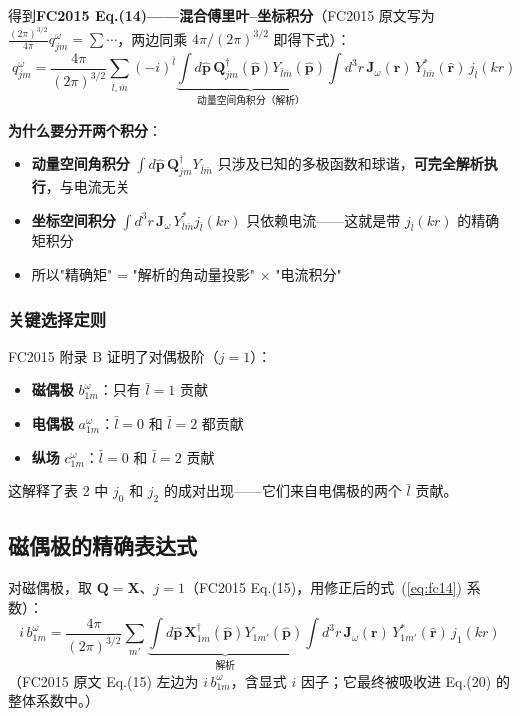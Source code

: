 得到\textbf{FC2015 Eq.(14)——混合傅里叶--坐标积分}（FC2015 原文写为
$\frac{(2\pi)^{3/2}}{4\pi}q^\omega_{jm}=\sum\cdots$，两边同乘 $4\pi/(2\pi)^{3/2}$ 即得下式）：
\begin{equation}
  \boxed{\;
  q^\omega_{jm} = \frac{4\pi}{(2\pi)^{3/2}}\sum_{\bar{l},\bar{m}}(-i)^{\bar{l}}
    \underbrace{\int d\hat{\mathbf{p}}\,\mathbf{Q}^\dagger_{jm}(\hat{\mathbf{p}})Y_{\bar{l}\bar{m}}(\hat{\mathbf{p}})}_{\text{动量空间角积分（解析）}}
    \int d^3r\,\mathbf{J}_\omega(\mathbf{r})\,Y^*_{\bar{l}\bar{m}}(\hat{\mathbf{r}})\,j_{\bar{l}}(kr)
  \;}
  \label{eq:fc14}
\end{equation}

\begin{nontrivial}
\textbf{为什么要分开两个积分}：
\begin{itemize}
  \item \textbf{动量空间角积分} $\int d\hat{\mathbf{p}}\,\mathbf{Q}^\dagger_{jm}Y_{\bar{l}\bar{m}}$
    只涉及已知的多极函数和球谐，\textbf{可完全解析执行}，与电流无关
  \item \textbf{坐标空间积分} $\int d^3r\,\mathbf{J}_\omega\,Y^*_{\bar{l}\bar{m}}j_{\bar{l}}(kr)$
    只依赖电流——这就是带 $j_{\bar{l}}(kr)$ 的精确矩积分
  \item 所以"精确矩" = "解析的角动量投影" $\times$ "电流积分"
\end{itemize}
\end{nontrivial}

\subsubsection{关键选择定则}

FC2015 附录 B 证明了对偶极阶（$j=1$）：
\begin{itemize}
  \item \textbf{磁偶极} $b^\omega_{1m}$：只有 $\bar{l}=1$ 贡献
  \item \textbf{电偶极} $a^\omega_{1m}$：$\bar{l}=0$ 和 $\bar{l}=2$ 都贡献
  \item \textbf{纵场} $c^\omega_{1m}$：$\bar{l}=0$ 和 $\bar{l}=2$ 贡献
\end{itemize}
这解释了表 2 中 $j_0$ 和 $j_2$ 的成对出现——它们来自电偶极的两个 $\bar{l}$ 贡献。

\subsection{磁偶极的精确表达式}

对磁偶极，取 $\mathbf{Q}=\mathbf{X}$、$j=1$（FC2015 Eq.(15)，用修正后的式~(\ref{eq:fc14}) 系数）：
\begin{equation}
  i\,b^\omega_{1m} = \frac{4\pi}{(2\pi)^{3/2}}\sum_{m'}\underbrace{\int d\hat{\mathbf{p}}\,
    \mathbf{X}^\dagger_{1m}(\hat{\mathbf{p}})Y_{1m'}(\hat{\mathbf{p}})}_{\text{解析}}
    \int d^3r\,\mathbf{J}_\omega(\mathbf{r})\,Y^*_{1m'}(\hat{\mathbf{r}})\,j_1(kr)
\end{equation}
（FC2015 原文 Eq.(15) 左边为 $i\,b^\omega_{1m}$，含显式 $i$ 因子；它最终被吸收进 Eq.(20) 的整体系数中。）

